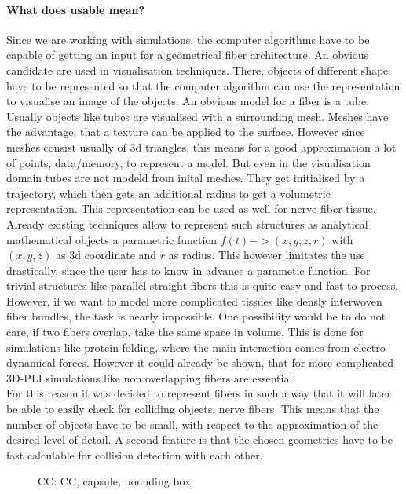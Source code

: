 \paragraph{What does usable mean?}
Since we are working with simulations, the computer algorithms have to be capable of getting an input for a geometrical fiber architecture.
An obvious candidate are used in visualisation techniques.
There, objects of different shape have to be represented so that the computer algorithm can use the representation to visualise an image of the objects.
An obvious model for a fiber is a tube.
Usually objects like tubes are visualised with a surrounding mesh.
Meshes have the advantage, that a texture can be applied to the surface.
However since meshes consist usually of 3d triangles, this means for a good approximation a lot of points, \ie data/memory, to represent a model.
But even in the visualisation domain tubes are not modeld from inital meshes.
They get initialised by a trajectory, which then gets an additional radius to get a volumetric representation.
This representation can be used as well for nerve fiber tissue.
\\
% 
Already existing techniques \dummy allow to represent such structures as analytical mathematical objects \eg a parametric function $f(t) -> (x,y,z,r)$ with $(x,y,z)$ as 3d coordinate and $r$ as radius.
This however limitates the use drastically, since the user has to know in advance a parametic function.
For trivial structures like parallel straight fibers this is quite easy and fast to process.
However, if we want to model more complicated tissues like densly interwoven fiber bundles, the task is nearly impossible.
One possibility would be to do not care, if two fibers overlap, \ie take the same space in volume.
This is done \eg for simulations like protein folding, where the main interaction comes from electro dynamical forces.
However it could already be shown, that for more complicated \ac{3D-PLI} simulations like \dummy non overlapping fibers are essential.
\\
% 
For this reason it was decided to represent fibers in such a way that it will later be able to easily check for colliding objects, \ie nerve fibers.
This means that the number of objects have to be small, with respect to the approximation of the desired level of detail.
A second feature is that the chosen geometries have to be fast calculable for collision detection with each other.
\\
% 
\begin{figure}[!t]
    \centering
    \def\tikzwidth{0.75\textwidth}
    \tikzset{external/export=false}
	\caption[cc and co]{\Acf{CC}:  \ac{CC},  capsule,  bounding box}
	\label{fig:conical_capsule}
\end{figure}
